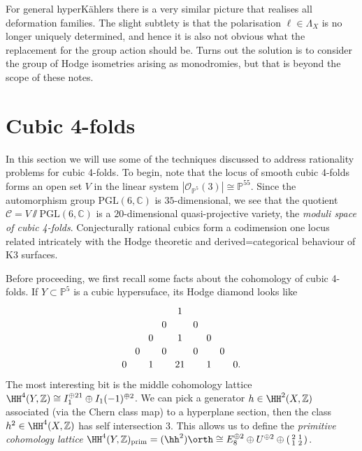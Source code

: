 \begin{remark}
    For general hyperK\"ahlers there is a very similar picture that realises all
    deformation families. The slight subtlety is that the polarisation \(\ell\in
    \Lambda_X\) is no longer uniquely determined, and hence it is also not
    obvious what the replacement for the group action should be.
    Turns out the solution is to consider the group of Hodge isometries arising
    as monodromies, but that is beyond the scope of these notes.
\end{remark}

\section{Cubic 4-folds}

In this section we will use some of the techniques discussed to address
rationality problems for cubic 4-folds. To begin, note that the locus of smooth cubic 4-folds forms an open set \(V\) in the linear system \(|\mathscr{O}_{\mathbb{P}^5}(3)|\cong \mathbb{P}^{55}\). Since the automorphism group \(\text{PGL}(6,\mathbb{C})\) is \(35\)-dimensional, we see that the quotient \(\mathcal{C}=V\sslash \text{PGL}(6,\mathbb{C})\) is a \(20\)-dimensional quasi-projective variety, the \textit{moduli space of cubic
4-folds}. Conjecturally rational cubics form a codimension one locus related
intricately with the Hodge theoretic and derived=categorical behaviour of K3
surfaces.

Before proceeding, we first recall some facts about the cohomology of cubic 4-folds. If \(Y\subset \mathbb{P}^5\) is a cubic hypersuface, its Hodge diamond looks like
\[\begin{tikzcd}[column sep=0em, row sep = 0em]
    &&&& 1 &&&& \\
    &&& 0 && 0 &&&\\
    && 0 && 1 && 0 && \\
    &0 &&0 &&0 &&0&\\
    0&&1&&21&&1&&0.
\end{tikzcd} \]
The most interesting bit is the middle cohomology lattice
\(\HH^4(Y,\mathbb{Z})\cong I_1^{\oplus 21}\oplus I_1(-1)^{\oplus 2}\). We can pick a generator \(h\in \HH^2(X,\mathbb{Z})\) associated
(via the Chern class map) to a hyperplane section, then the class \(h^2\in
\HH^4(X,\mathbb{Z})\) has self intersection \(3\). This allows us to define
the \textit{primitive cohomology lattice}
\(\HH^4(Y,\mathbb{Z})_\text{prim}=(\hh^2)\orth \cong E_8^{\oplus 2}\oplus U^{\oplus 2}\oplus
\left(\begin{smallmatrix}2&1\\1&2\end{smallmatrix}\right)\).

